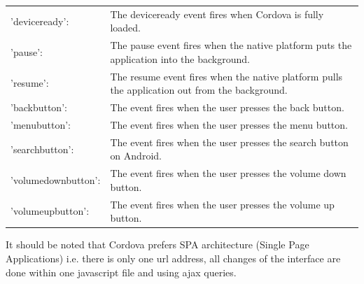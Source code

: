 \begin{tabularx}{\textwidth}{lX}
'deviceready':& The deviceready event fires when Cordova is fully loaded.\\
'pause': & The pause event fires when the native platform puts the application into the background.\\
'resume':& The resume event fires when the native platform pulls the application out from the background.\\
'backbutton':& The event fires when the user presses the back button.\\
'menubutton':& The event fires when the user presses the menu button. \\
'searchbutton':& The event fires when the user presses the search button on Android. \\
'volumedownbutton':& The event fires when the user presses the volume down button.\\
'volumeupbutton':& The event fires when the user presses the volume up button.\\
\end{tabularx}

It should be noted that Cordova prefers SPA architecture (Single Page Applications) i.e. there is only one url address, all changes of the interface are done within one javascript file and using ajax queries.



